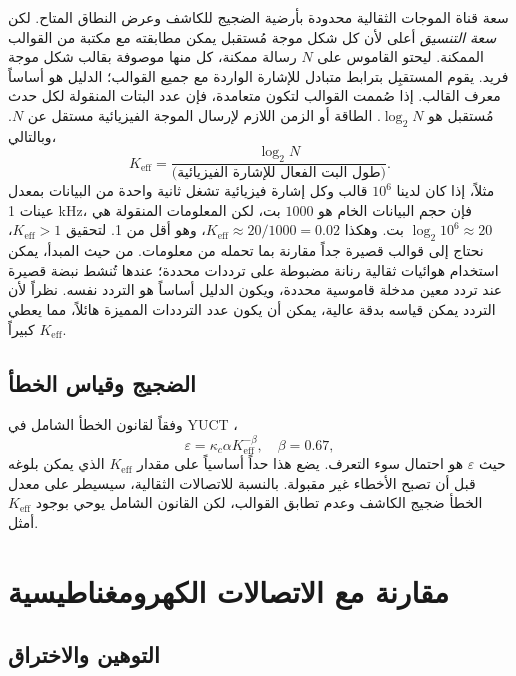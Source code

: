 \documentclass[11pt,a4paper]{article}
\newcommand{\Keff}{K_{\mathrm{eff}}}
\newcommand{\kappac}{\kappa_c}
\newcommand{\eps}{\varepsilon}
\begin{document}
	سعة قناة الموجات الثقالية محدودة بأرضية الضجيج للكاشف وعرض النطاق المتاح. لكن \emph{سعة التنسيق} أعلى لأن كل شكل موجة مُستقبل يمكن مطابقته مع مكتبة من القوالب الممكنة. ليحتو القاموس على \(N\) رسالة ممكنة، كل منها موصوفة بقالب شكل موجة فريد. يقوم المستقبِل بترابط متبادل للإشارة الواردة مع جميع القوالب؛ الدليل هو أساساً معرف القالب. إذا صُممت القوالب لتكون متعامدة، فإن عدد البتات المنقولة لكل حدث مُستقبل هو \(\log_2 N\). الطاقة أو الزمن اللازم لإرسال الموجة الفيزيائية مستقل عن \(N\). وبالتالي،
	\begin{equation}
		\Keff = \frac{\log_2 N}{\text{(طول البت الفعال للإشارة الفيزيائية)}}.
	\end{equation}
	مثلاً، إذا كان لدينا \(10^6\) قالب وكل إشارة فيزيائية تشغل ثانية واحدة من البيانات بمعدل عينات 1 kHz، فإن حجم البيانات الخام هو \(1000\) بت، لكن المعلومات المنقولة هي \(\log_2 10^6 \approx 20\) بت. وهكذا \(\Keff \approx 20/1000 = 0.02\)، وهو أقل من 1. لتحقيق \(\Keff > 1\)، نحتاج إلى قوالب قصيرة جداً مقارنة بما تحمله من معلومات. من حيث المبدأ، يمكن استخدام هوائيات ثقالية رنانة مضبوطة على ترددات محددة؛ عندها تُنشط نبضة قصيرة عند تردد معين مدخلة قاموسية محددة، ويكون الدليل أساساً هو التردد نفسه. نظراً لأن التردد يمكن قياسه بدقة عالية، يمكن أن يكون عدد الترددات المميزة هائلاً، مما يعطي \(\Keff\) كبيراً.
	
	\subsection{الضجيج وقياس الخطأ}
	
	وفقاً لقانون الخطأ الشامل في YUCT \cite{AppendixL}،
	\begin{equation}
		\eps = \kappac \alpha \Keff^{-\beta}, \quad \beta = 0.67,
		\label{eq:universal-scaling}
	\end{equation}
	حيث \(\eps\) هو احتمال سوء التعرف. يضع هذا حداً أساسياً على مقدار \(\Keff\) الذي يمكن بلوغه قبل أن تصبح الأخطاء غير مقبولة. بالنسبة للاتصالات الثقالية، سيسيطر على معدل الخطأ ضجيج الكاشف وعدم تطابق القوالب، لكن القانون الشامل يوحي بوجود \(\Keff\) أمثل.
	
	\section{مقارنة مع الاتصالات الكهرومغناطيسية}
	\label{sec:comparison}
	
	\subsection{التوهين والاختراق}
	
\end{document}
